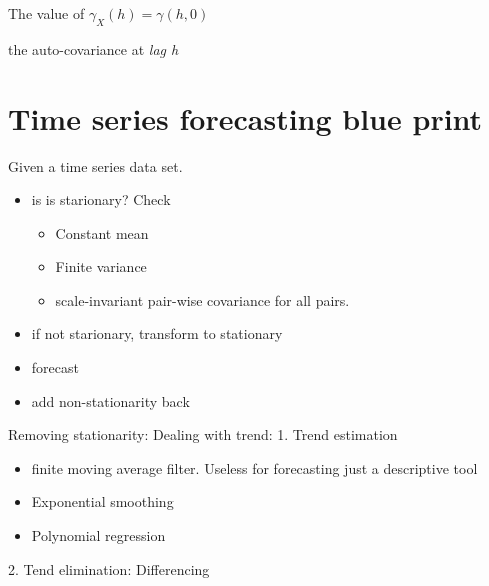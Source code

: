 \documentclass{article}
\begin{document}
The value of $\gamma_X(h) = \gamma(h,0)$

the auto-covariance at \textit{lag h}



\section{Time series forecasting blue print}
Given a time series data set.
\begin{itemize}
\item is is starionary? Check
\begin{itemize}
\item Constant mean
\item Finite variance
\item scale-invariant pair-wise covariance for all pairs. 
\end{itemize}
\item if not starionary, transform to stationary
\item forecast
\item add non-stationarity back
\end{itemize}


Removing stationarity:
Dealing with trend:
1. Trend estimation
\begin{itemize}
\item finite moving average filter. Useless for forecasting just a descriptive tool
\item Exponential smoothing
\item Polynomial regression
\end{itemize}
2. Tend elimination: Differencing 
\end{document}
